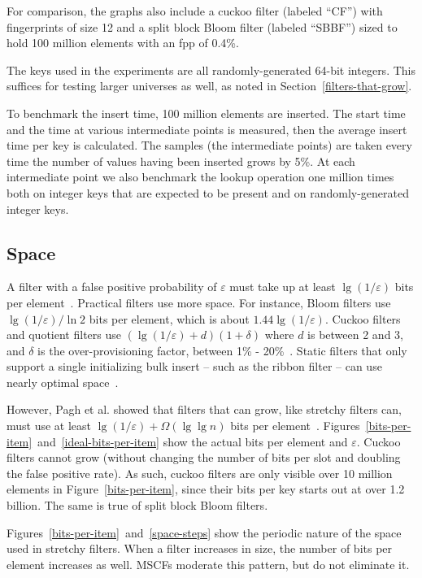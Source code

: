\documentclass[letterpaper,twocolumn,10pt]{article}
\newcommand{\etal}{et al.}
\newcommand{\taffy}{stretchy}
\newcommand{\MTCF}{MSCF}
\newcommand{\taffy}{taffy}
\newcommand{\MTCF}{MTCF}
\begin{document}
For comparison, the graphs also include a cuckoo filter (labeled ``CF'') with fingerprints of size 12 and a split block Bloom filter (labeled ``SBBF'') sized to hold 100 million elements with an fpp of 0.4\%.

The keys used in the experiments are all randomly-generated 64-bit integers.
This suffices for testing larger universes as well, as noted in Section~\ref{filters-that-grow}.

To benchmark the insert time, 100 million elements are inserted.
The start time and the time at various intermediate points is measured, then the average insert time per key is calculated.
The samples (the intermediate points) are taken every time the number of values having been inserted grows by 5\%.
At each intermediate point we also benchmark the lookup operation one million times both on integer keys that are expected to be present and on randomly-generated integer keys.

\subsection{Space}

A filter with a false positive probability of $\varepsilon$ must take up at least $\lg (1/\varepsilon)$ bits per element~\cite{lower-bound}.
Practical filters use more space.
For instance, Bloom filters use $\lg (1/\varepsilon)/\ln 2$ bits per element, which is about $1.44 \lg (1/\varepsilon)$.
Cuckoo filters and quotient filters use $(\lg (1/\varepsilon) + d) (1 + \delta)$ where $d$ is between 2 and 3, and $\delta$ is the over-provisioning factor, between 1\% - 20\%~\cite{cuckoo,quotient-filter,vector-quotient}.
Static filters that only support a single initializing bulk insert -- such as the ribbon filter -- can use nearly optimal space~\cite{ribbon}.

However, Pagh \etal{} showed that filters that can grow, like \taffy{} filters can, must use at least $\lg (1/\varepsilon) + \Omega(\lg \lg n)$ bits per element~\cite{psw}.
Figures~\ref{bits-per-item}~and~\ref{ideal-bits-per-item} show the actual bits per element and $\varepsilon$.
Cuckoo filters cannot grow (without changing the number of bits per slot and doubling the false positive rate).
As such, cuckoo filters are only visible over 10 million elements in Figure~\ref{bits-per-item}, since their bits per key starts out at over 1.2 billion.
The same is true of split block Bloom filters.

Figures~\ref{bits-per-item}~and~\ref{space-steps} show the periodic nature of the space used in \taffy{} filters.
When a filter increases in size, the number of bits per element increases as well.
\MTCF{}s moderate this pattern, but do not eliminate it.
\end{document}
